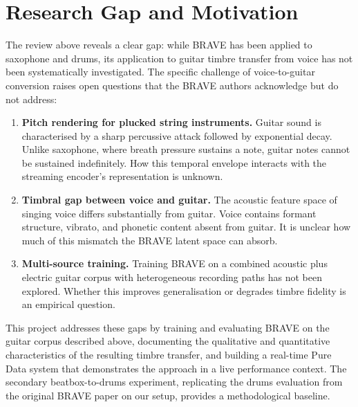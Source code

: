 \section{Research Gap and Motivation}
\label{sec:sota_gap}

The review above reveals a clear gap: while BRAVE has been applied to saxophone and drums, its application to guitar timbre transfer from voice has not been systematically investigated. The specific challenge of voice-to-guitar conversion raises open questions that the BRAVE authors acknowledge but do not address:

\begin{enumerate}
    \item \textbf{Pitch rendering for plucked string instruments.} Guitar sound is characterised by a sharp percussive attack followed by exponential decay. Unlike saxophone, where breath pressure sustains a note, guitar notes cannot be sustained indefinitely. How this temporal envelope interacts with the streaming encoder's representation is unknown.
    \item \textbf{Timbral gap between voice and guitar.} The acoustic feature space of singing voice differs substantially from guitar. Voice contains formant structure, vibrato, and phonetic content absent from guitar. It is unclear how much of this mismatch the BRAVE latent space can absorb.
    \item \textbf{Multi-source training.} Training BRAVE on a combined acoustic plus electric guitar corpus with heterogeneous recording paths has not been explored. Whether this improves generalisation or degrades timbre fidelity is an empirical question.
\end{enumerate}

This project addresses these gaps by training and evaluating BRAVE on the guitar corpus described above, documenting the qualitative and quantitative characteristics of the resulting timbre transfer, and building a real-time Pure Data system that demonstrates the approach in a live performance context. The secondary beatbox-to-drums experiment, replicating the drums evaluation from the original BRAVE paper on our setup, provides a methodological baseline.
